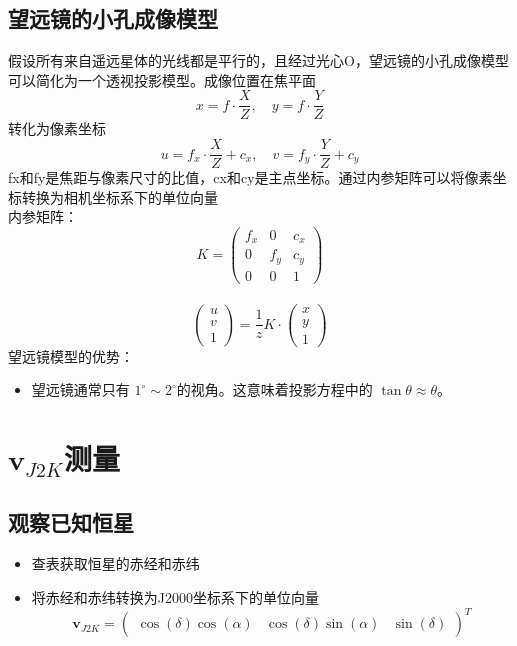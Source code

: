 \documentclass{ctexart}
\begin{document}
\subsection{望远镜的小孔成像模型}
假设所有来自遥远星体的光线都是平行的，且经过光心O，望远镜的小孔成像模型可以简化为一个透视投影模型。成像位置在焦平面\\
\begin{equation}
    x = f \cdot \frac{X}{Z}, \quad y = f \cdot \frac{Y}{Z}
\end{equation}
转化为像素坐标
\begin{equation}
    u = f_x \cdot \frac{X}{Z} + c_x, \quad v = f_y \cdot \frac{Y}{Z} + c_y
\end{equation}
fx和fy是焦距与像素尺寸的比值，cx和cy是主点坐标。通过内参矩阵可以将像素坐标转换为相机坐标系下的单位向量
\\
内参矩阵：
\begin{equation}
    K = 
    \begin{pmatrix}
        f_x & 0 & c_x \\
        0 & f_y & c_y \\
        0 & 0 & 1
    \end{pmatrix}
\end{equation}
\\
\begin{equation}
     \begin{pmatrix}
         u \\
         v \\
        1
        \end{pmatrix} 
        =\frac{1}{z} K \cdot  \begin{pmatrix}
         x \\
         y \\
         1
        \end{pmatrix}
\end{equation}
望远镜模型的优势：
\begin{itemize}
    \item 望远镜通常只有 $1^\circ \sim 2^\circ$的视角。这意味着投影方程中的 $\tan \theta \approx \theta$。
\end{itemize}
\newpage
\section{$\bm{v}_{J2K}$测量}
\subsection{观察已知恒星}
\begin{itemize}
    \item 查表获取恒星的赤经和赤纬
    \item 将赤经和赤纬转换为J2000坐标系下的单位向量\begin{equation}
        \bm{v}_{J2K} = 
        {\begin{pmatrix}
            \cos(\delta) \cos(\alpha) &
            \cos(\delta) \sin(\alpha) &
            \sin(\delta)\end{pmatrix}}^T
    \end{equation}
\end{itemize}
\end{document}
